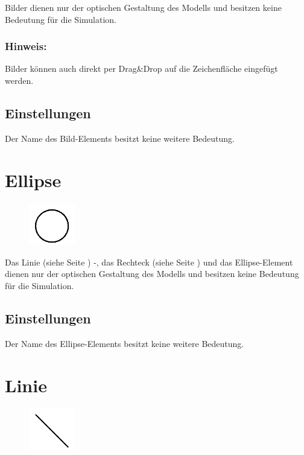 Bilder dienen nur der optischen Gestaltung des Modells und besitzen keine Bedeutung für die Simulation.

\subsubsection*{Hinweis:}

Bilder können auch direkt per Drag\&Drop auf die Zeichenfläche eingefügt werden.

\subsection*{Einstellungen}

Der Name des Bild-Elements besitzt keine weitere Bedeutung.


\section{Ellipse}
\label{ref:ModelElementEllipse}

\begin{figure}
\vspace{-22pt}
\includegraphics[width=2cm]{imageModelElementEllipse.png}
\vspace{-22pt}
\end{figure}

Das Linie (siehe Seite \pageref{ref:ModelElementLine}) -, das Rechteck (siehe Seite \pageref{ref:ModelElementRectangle}) 
und das Ellipse-Element dienen nur der optischen Gestaltung des Modells und besitzen keine Bedeutung für die Simulation.

\subsection*{Einstellungen}

Der Name des Ellipse-Elements besitzt keine weitere Bedeutung.


\section{Linie}
\label{ref:ModelElementLine}

\begin{figure}
\vspace{-22pt}
\includegraphics[width=2cm]{imageModelElementLine.png}
\vspace{-22pt}
\end{figure}

